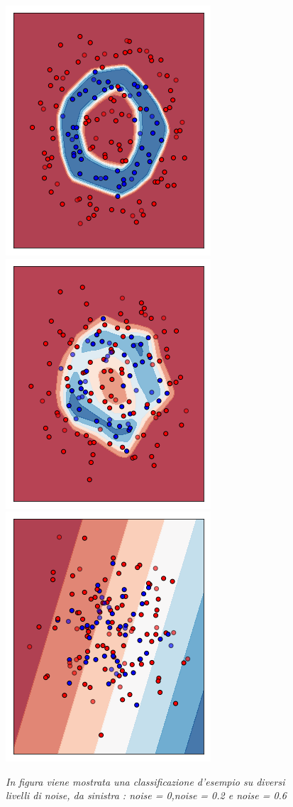 \documentclass[12pt,a4paper]{report}
\begin{document}
\begin{figure}[H]
 \centering
 \includegraphics[scale = 0.4]{images/circles+-noise0,1.png}
 \includegraphics[scale = 0.4]{images/circles+-noise0,2.png}
 \includegraphics[scale = 0.4]{images/circles+-noise0,4.png}
 \caption{\textit{In figura viene mostrata una classificazione d'esempio su diversi livelli di noise, da sinistra : noise = 0,noise = 0.2 e noise = 0.6 }}
 \label{exnoisecircles+}
\end{figure}
\end{document}
